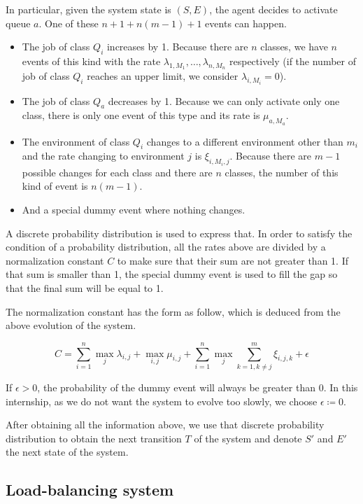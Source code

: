 \documentclass[
  a4paper, xcolor = usenames,dvipsnames]{article}
\providecommand{\tightlist}{%
  \setlength{\itemsep}{0pt}\setlength{\parskip}{0pt}}
\begin{document}
In particular, given the system state is \((S, E)\), the agent decides to activate queue \(a\). One of these \(n + 1 + n(m - 1) + 1\) events can happen.

\begin{itemize}
\tightlist
\item
  The job of class \(Q_{i}\) increases by 1. Because there are \(n\) classes, we have \(n\) events of this kind with the rate \(\lambda_{1, M_{1}}, \dots, \lambda_{n, M_{n}}\) respectively (if the number of job of class \(Q_{i}\) reaches an upper limit, we consider \(\lambda_{i, M_{i}} = 0\)).
\item
  The job of class \(Q_{a}\) decreases by 1. Because we can only activate only one class, there is only one event of this type and its rate is \(\mu_{a, M_{a}}\).
\item
  The environment of class \(Q_{i}\) changes to a different environment other than \(m_{i}\) and the rate changing to environment \(j\) is \(\xi_{i, M_{i}, j}\). Because there are \(m - 1\) possible changes for each class and there are \(n\) classes, the number of this kind of event is \(n(m - 1)\).
\item
  And a special dummy event where nothing changes.
\end{itemize}

A discrete probability distribution is used to express that. In order to satisfy the condition of a probability distribution, all the rates above are divided by a normalization constant \(C\) to make sure that their sum are not greater than 1. If that sum is smaller than 1, the special dummy event is used to fill the gap so that the final sum will be equal to 1.

The normalization constant has the form as follow, which is deduced from the above evolution of the system.

\[
C = \sum_{i = 1}^{n} \max_{j} \lambda_{i, j} + \max_{i, j} \mu_{i, j} + \sum_{i = 1}^{n} \max_{j} \sum_{k = 1, k \neq j}^{m} \xi_{i, j, k} + \epsilon
\]

If \(\epsilon > 0\), the probability of the dummy event will always be greater than 0. In this internship, as we do not want the system to evolve too slowly, we choose \(\epsilon \coloneq 0\).

After obtaining all the information above, we use that discrete probability distribution to obtain the next transition \(T\) of the system and denote \(S'\) and \(E'\) the next state of the system.

\hypertarget{load-balancing-system}{%
\subsection{Load-balancing system}\label{load-balancing-system}}
\end{document}
